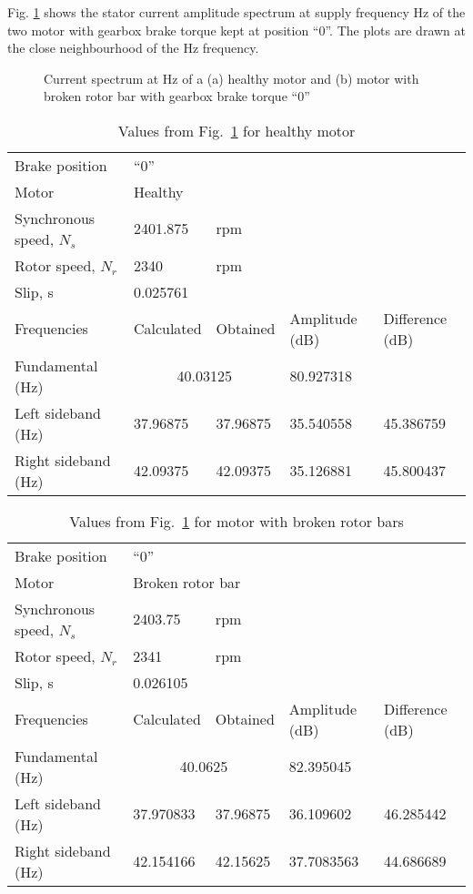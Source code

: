 \documentclass[a4paper,11pt]{report}
\begin{document}
\clearpage
Fig. \ref{hb040ss} shows the stator current amplitude spectrum at supply frequency \unit[40]{Hz} of the two motor with gearbox brake torque kept at position ``0''. The plots are drawn at the close neighbourhood of the \unit[40]{Hz} frequency.

\begin{figure}[htbp]
\centering
\subfigure[]{\texttt{[image: h040]}}
\subfigure[]{\texttt{[image: b040]}}
\caption{Current spectrum at \unit[40]{Hz} of a (a) healthy motor and (b) motor with broken rotor bar with gearbox brake torque ``0''} \label{hb040ss}
\end{figure}

\begin{table}[h]
\centering
\begin{tabular}{lllll}
Brake position	& ``0'' & & & \\			
Motor &	\multicolumn{4}{l}{Healthy} \\ 
Synchronous speed, $N_{s}$	& 2401.875& rpm & & \\			
Rotor speed, $N_{r}$ 	  	& 2340	& rpm& & \\		
Slip, s			  	& \multicolumn{4}{l}{0.025761} \\			
Frequencies 		  	& Calculated & Obtained & Amplitude (dB) & Difference (dB) \\
Fundamental (Hz)		& \multicolumn{2}{c}{40.03125}	& 80.927318	&  \\ 
Left sideband (Hz) 		& 37.96875 & 37.96875 & 35.540558 & 45.386759 \\
Right sideband (Hz)		& 42.09375 & 42.09375 & 35.126881 & 45.800437 
\end{tabular}
\caption{Values from Fig.~\ref{hb040ss} for healthy motor}\label{h040sst}
\end{table}

\begin{table}[h]
\centering
\begin{tabular}{lllll}
Brake position	& ``0'' & & & \\			
Motor &	\multicolumn{4}{l}{Broken rotor	bar} \\ 
Synchronous speed, $N_{s}$	&  2403.75		& rpm & & \\			
Rotor speed, $N_{r}$ 	  	& 2341		& rpm& & \\		
Slip, s			  	& \multicolumn{4}{l}{0.026105} \\			
Frequencies 		  	& Calculated & Obtained & Amplitude (dB) & Difference (dB) \\
Fundamental (Hz)		& \multicolumn{2}{c}{40.0625}	&82.395045 	&  \\ 
Left sideband (Hz) 		& 37.970833 & 37.96875  & 36.109602 & 46.285442 \\
Right sideband (Hz)		& 42.154166 & 42.15625 & 37.7083563 & 44.686689 
\end{tabular}
\caption{Values from Fig.~\ref{hb040ss} for motor with broken rotor bars} \label{b040sst}
\end{table}
\end{document}
